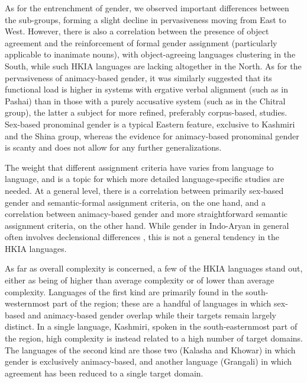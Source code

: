 \documentclass[output=collectionpaper]{langsci/langscibook}
\begin{document}
As for the entrenchment of gender, we observed important differences between the sub-groups, forming a slight decline in pervasiveness moving from East to West. However, there is also a correlation between the presence of object agreement and the reinforcement of formal gender assignment (particularly applicable to inanimate nouns), with object-agreeing languages clustering in the South, while such HKIA languages are lacking altogether in the North. As for the pervasiveness of animacy-based gender, it was similarly suggested that its functional load is higher in systems with ergative verbal alignment (such as in Pashai) than in those with a purely accusative system (such as in the Chitral group), the latter a subject for more refined, preferably corpus-based, studies. Sex-based pronominal gender is a typical Eastern feature, exclusive to Kashmiri and the Shina group, whereas the evidence for animacy-based pronominal gender is scanty and does not allow for any further generalizations.

The weight that different assignment criteria have varies from language to language, and is a topic for which more detailed language-specific studies are needed. At a general level, there is a correlation between primarily sex-based gender and semantic-formal assignment criteria, on the one hand, and a correlation between animacy-based gender and more straightforward semantic assignment criteria, on the other hand. While gender in Indo-Aryan in general often involves declensional differences \citep[219]{Masica1991}, this is not a general tendency in the HKIA languages.

As far as overall complexity is concerned, a few of the HKIA languages stand out, either as being of higher than average complexity or of lower than average complexity. Languages of the first kind are primarily found in the south-westernmost part of the region; these are a handful of languages in which sex-based and animacy-based gender overlap while their targets remain largely distinct. In a single language, Kashmiri, spoken in the south-easternmost part of the region, high complexity is instead related to a high number of target domains. The languages of the second kind are those two (Kalasha and Khowar) in which gender is exclusively animacy-based, and another language (Grangali) in which agreement has been reduced to a single target domain.
\end{document}

